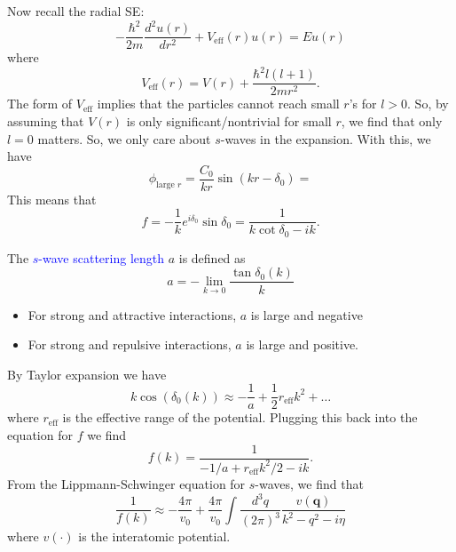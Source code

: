 \documentclass{book}
\theoremstyle{definition}
\newcommand{\f}[2]{\frac{#1}{#2}}
\begin{document}
Now recall the radial SE:
\begin{equation*}
-\f{\hbar^2}{2m}\f{d^2 u(r)}{dr^2} + V_\text{eff}(r)u(r) = Eu(r)
\end{equation*} 
where
\begin{equation*}
V_\text{eff}(r) = V(r) + \f{\hbar^2l(l+1)}{2mr^2}.
\end{equation*}
The form of $V_\text{eff}$ implies that the particles cannot reach small $r$'s for $l>0$. So, by assuming that $V(r)$ is only significant/nontrivial for small $r$, we find that only $l=0$ matters. So, we only care about $s$-waves in the expansion. With this, we have
\begin{equation*}
\phi_{\text{large } r} = \f{C_0}{kr} \sin(kr - \delta_0) = 
\end{equation*}
This means that
\begin{equation*}
f = -\f{1}{k}e^{i\delta_0 }\sin\delta_0 = \f{1}{k\cot\delta_0 -ik}. 
\end{equation*}

The \textcolor{blue}{$s$-wave scattering length} $a$ is defined as 
\begin{equation*}
a = -\lim_{k\to 0}\f{\tan \delta_0 (k)}{k}
\end{equation*}
\begin{itemize}
	\item For strong and attractive interactions, $a$ is large and negative
	
	\item For strong and repulsive interactions, $a$ is large and positive. 
\end{itemize}
By Taylor expansion we have
\begin{equation*}
k\cos(\delta_0(k)) \approx -\f{1}{a} + \f{1}{2}r_\text{eff} k^2 + \dots
\end{equation*}
where $r_\text{eff}$ is the effective range of the potential. Plugging this back into the equation for $f$ we find 
\begin{equation*}
f(k) = \f{1}{-1/a + r_\text{eff} k^2/2 - ik}.
\end{equation*}
From the Lippmann-Schwinger equation for $s$-waves, we find that 
\begin{equation*}
\f{1}{f(k)} \approx -\f{4\pi}{v_0} + \f{4\pi}{v_0} \int\f{d^3q}{(2\pi)^3} \f{v(\mathbf{q})}{k^2 - q^2 - i\eta}
\end{equation*}
where $v(\cdot)$ is the interatomic potential. \\
\end{document}
